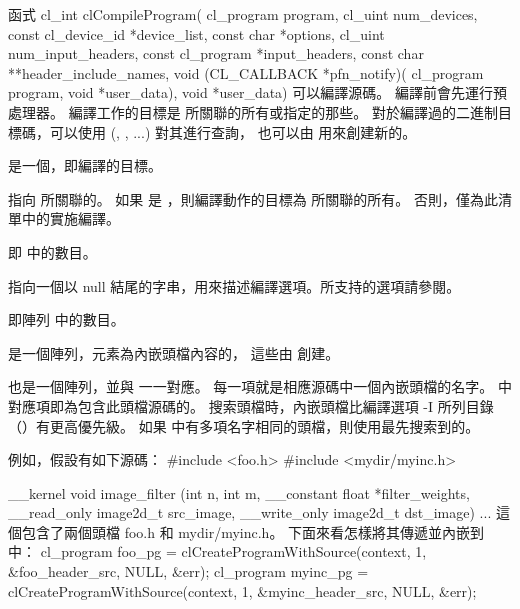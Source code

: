 函式
\startCLFUNC
cl_int clCompileProgram(
		cl_program program,
		cl_uint num_devices,
		const cl_device_id *device_list,
		const char *options,
		cl_uint num_input_headers,
		const cl_program *input_headers,
		const char **header_include_names,
		void (CL_CALLBACK *pfn_notify)(
				cl_program program,
				void *user_data),
		void *user_data)
\stopCLFUNC
可以編譯源碼。
編譯前會先運行預處理器。
編譯工作的目標是  所關聯的所有或指定的那些。
對於編譯過的二進制目標碼，可以使用 (, , ...) 對其進行查詢，
也可以由  用來創建新的。

 是一個，即編譯的目標。

 指向  所關聯的。
如果  是 ，則編譯動作的目標為  所關聯的所有。
否則，僅為此清單中的實施編譯。

 即  中的數目。

 指向一個以 null 結尾的字串，用來描述編譯選項。所支持的選項請參閱。

 即陣列  中的數目。

 是一個陣列，元素為內嵌頭檔內容的，
這些由  創建。

 也是一個陣列，並與  一一對應。
每一項就是相應源碼中一個內嵌頭檔的名字。
  中對應項即為包含此頭檔源碼的。
搜索頭檔時，內嵌頭檔比編譯選項 -I 所列目錄（）有更高優先級。
如果  中有多項名字相同的頭檔，則使用最先搜索到的。

例如，假設有如下源碼：
\startclc
#include <foo.h>
#include <mydir/myinc.h>

__kernel void image_filter (int n, int m,
			__constant float *filter_weights,
			__read_only image2d_t src_image,
			__write_only image2d_t dst_image)
{
	...
}
\stopclc
這個包含了兩個頭檔 foo.h 和 mydir/myinc.h。
下面來看怎樣將其傳遞並內嵌到中：
\startclc
cl_program foo_pg = clCreateProgramWithSource(context,
				1, &foo_header_src, NULL, &err);
cl_program myinc_pg = clCreateProgramWithSource(context,
				1, &myinc_header_src, NULL, &err);

